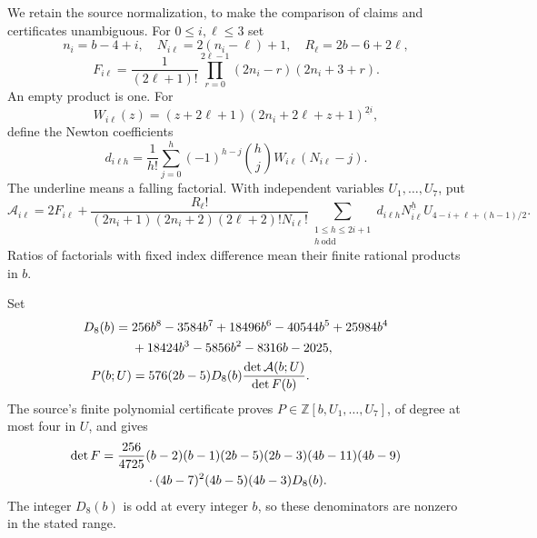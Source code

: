 We retain the source normalization, to make the comparison of claims
and certificates unambiguous. For $0\le i,\ell\le3$ set
\[
 n_i=b-4+i,\quad N_{i\ell}=2(n_i-\ell)+1,\quad
 R_\ell=2b-6+2\ell,
\]
\[
 F_{i\ell}=\frac1{(2\ell+1)!}
       \prod_{r=0}^{2\ell-1}(2n_i-r)(2n_i+3+r).
\]
An empty product is one. For
\[
 W_{i\ell}(z)=(z+2\ell+1)
                 (2n_i+2\ell+z+1)^{\underline{2i}},
\]
define the Newton coefficients
\begin{equation}\label{r8c:d}
 d_{i\ell h}=\frac1{h!}\sum_{j=0}^{h}
 (-1)^{h-j}\binom hj W_{i\ell}(N_{i\ell}-j).
\end{equation}
The underline means a falling factorial. With independent variables
$U_1,\ldots,U_7$, put
\begin{equation}\label{r8c:smallA}
 \mathcal A_{i\ell}=2F_{i\ell}+
 \frac{R_\ell!}
 {(2n_i+1)(2n_i+2)(2\ell+2)!N_{i\ell}!}
 \sum_{\substack{1\le h\le2i+1\\ h\ \mathrm{odd}}}
 d_{i\ell h}N_{i\ell}^{\underline h}
 U_{4-i+\ell+(h-1)/2}.
\end{equation}
Ratios of factorials with fixed index difference mean their finite
rational products in $b$.

Set
\begin{align}
 D_8(b)={}&256b^8-3584b^7+18496b^6-40544b^5+25984b^4
 \notag\\
 &+18424b^3-5856b^2-8316b-2025,
 \label{r8c:D8}\\
 P(b;U)&=576(2b-5)D_8(b)\frac{\det\mathcal A(b;U)}{\det F(b)}.
 \label{r8c:Pdef}
\end{align}
The source's finite polynomial certificate proves
$P\in\mathbb Z[b,U_1,\ldots,U_7]$, of degree at most four in
$U$, and gives
\begin{align}
 \det F={}&\frac{256}{4725}(b-2)(b-1)(2b-5)(2b-3)
 (4b-11)(4b-9)\notag\\
 &\hspace{8mm}\cdot(4b-7)^2(4b-5)(4b-3)D_8(b).
 \label{r8c:Fdet}
\end{align}
The integer $D_8(b)$ is odd at every integer $b$, so these denominators
are nonzero in the stated range.

